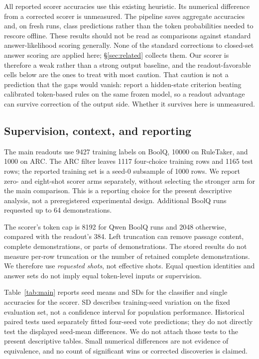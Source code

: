 All reported scorer accuracies use this existing heuristic. Its numerical
difference from a corrected scorer is unmeasured. The pipeline saves
aggregate accuracies and, on fresh runs, class predictions rather than the
token probabilities needed to rescore offline. These results should not be
read as comparisons against standard answer-likelihood scoring generally.
None of the standard corrections to closed-set answer scoring are applied
here; \S\ref{sec:related} collects them. Our scorer is therefore a weak
rather than a strong output baseline, and the readout-favorable cells below
are the ones to treat with most caution. That caution is not a prediction
that the gaps would vanish: \citet{cho2025hidden} report a hidden-state
criterion beating calibrated token-based rules on the same frozen model, so a
readout advantage can survive correction of the output side. Whether it
survives here is unmeasured.

\subsection{Supervision, context, and reporting}

The main readouts use 9427 training labels on BoolQ, 10000 on RuleTaker,
and 1000 on ARC. The ARC filter leaves 1117 four-choice training rows and
1165 test rows; the reported training set is a seed-0 subsample of 1000 rows.
We report zero- and eight-shot scorer arms separately,
without selecting the stronger arm for the main comparison. This is a
reporting choice for the present descriptive analysis, not a preregistered
experimental design. Additional BoolQ runs requested up to 64 demonstrations.

The scorer's token cap is 8192 for Qwen BoolQ runs and 2048
otherwise, compared with the readout's 384. Left truncation can remove
passage content, complete demonstrations, or parts of demonstrations. The
stored results do not measure per-row truncation or the number of retained
complete demonstrations. We therefore use \emph{requested shots}, not
effective shots. Equal question identities and answer sets do not imply
equal token-level inputs or supervision.

Table~\ref{tab:main} reports seed means and SDs for the classifier and single
accuracies for the scorer. SD describes training-seed variation on the fixed
evaluation set, not a confidence interval for population performance.
Historical paired tests used separately fitted four-seed vote predictions;
they do not directly test the displayed seed-mean differences. We do not
attach those tests to the present descriptive tables. Small numerical
differences are not evidence of equivalence, and no count of significant
wins or corrected discoveries is claimed.

